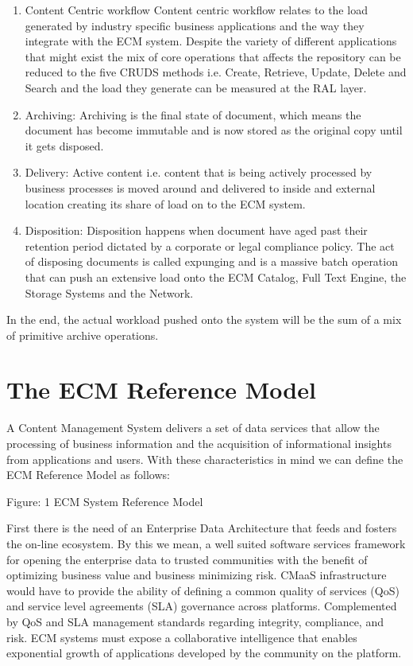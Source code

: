 \begin{enumerate}
\item Content Centric workflow 
Content centric workflow relates to the load generated by industry specific business applications and the way they integrate with the ECM system. Despite the variety of different applications that might exist the mix of core operations that affects the repository can be reduced to the five CRUDS methods i.e. Create, Retrieve, Update, Delete and Search and the load they generate can be measured at the RAL layer. 
\item Archiving:  
Archiving is the final state of document, which means the document has become immutable and is now stored as the original copy until it gets disposed. 
\item Delivery:  
Active content i.e. content that is being actively processed by business processes is moved around and delivered to inside and external location creating its share of load on to the ECM system.
\item Disposition:  
Disposition happens when document have aged past their retention period dictated by a corporate or legal compliance policy. The act of disposing documents is called expunging and is a massive batch operation that can push an extensive load onto the ECM Catalog, Full Text Engine, the Storage Systems and the Network.
\end{enumerate}
In the end, the actual workload pushed onto the system will be the sum of a mix of primitive archive operations.
\section{The ECM Reference Model}
A Content Management System delivers a set of data services that allow the processing of business information and the acquisition of informational insights from applications and users. With these characteristics in mind we can define the ECM Reference Model as follows:

Figure:  1 ECM System Reference Model

First there is the need of an Enterprise Data Architecture that feeds and fosters the on-line ecosystem. By this we mean, a well suited software services framework for opening the enterprise data to trusted communities with the benefit of optimizing business value and business minimizing risk. CMaaS infrastructure would have to provide the ability of defining a common quality of services (QoS) and service level agreements (SLA) governance across platforms. Complemented by QoS and SLA management standards regarding integrity, compliance, and risk.  ECM systems must expose a collaborative intelligence that enables exponential growth of applications developed by the community on the platform.   
 
